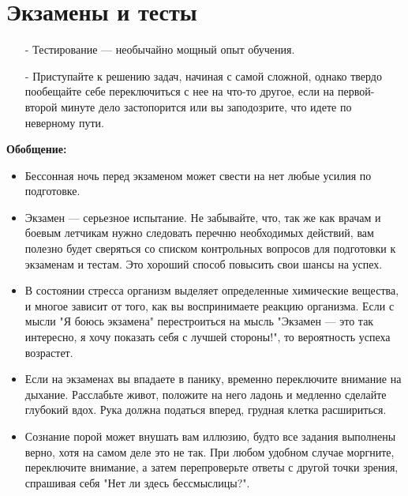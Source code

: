 \documentclass{article}
\begin{document}
\section{Экзамены и тесты}
\begin{itemize}
\item[-] Тестирование --- необычайно мощный опыт обучения.
\item[-] Приступайте к решению задач, начиная с самой сложной, однако твердо пообещайте себе переключиться с нее на что-то другое, если на первой-второй минуте дело застопорится или вы заподозрите, что идете по неверному пути.
\end{itemize}
\textbf{Обобщение:}
\begin{itemize}
\item Бессонная ночь перед экзаменом может свести на нет любые усилия по подготовке.
\item Экзамен --- серьезное испытание. Не забывайте, что, так же как врачам и боевым летчикам нужно следовать перечню необходимых действий, вам полезно будет сверяться со списком контрольных вопросов для подготовки к экзаменам и тестам. Это хороший способ повысить свои шансы на успех.
\item В состоянии стресса организм выделяет определенные химические вещества, и многое зависит от того, как вы воспринимаете реакцию организма. Если с мысли "Я боюсь экзамена" перестроиться на мысль "Экзамен --- это так интересно, я хочу показать себя с лучшей стороны!", то вероятность успеха возрастет.
\item Если на экзаменах вы впадаете в панику, временно переключите внимание на дыхание. Расслабьте живот, положите на него ладонь и медленно сделайте глубокий вдох. Рука должна податься вперед, грудная клетка расшириться.
\item Сознание порой может внушать вам иллюзию, будто все задания выполнены верно, хотя на самом деле это не так. При любом удобном случае моргните, переключите внимание, а затем перепроверьте ответы с другой точки зрения, спрашивая себя "Нет ли здесь бессмыслицы?".
\end{itemize}
\end{document}
